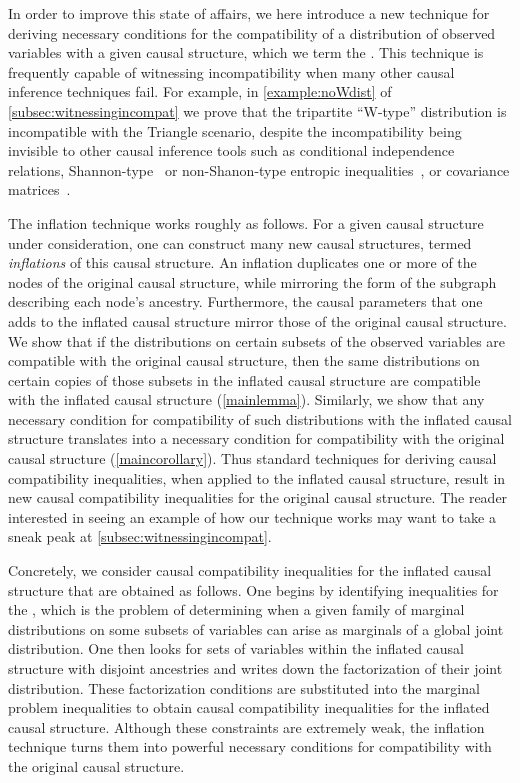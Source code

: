 \documentclass[aps,english,10pt,superscriptaddress,onecolumn,twoside,longbibliography,pra,floatfix,fleqn,nofootinbib]{revtex4-1}
\newcommand*{\tblue}[1]{{\color{medblue}{\textbf{#1}}}}
\theoremstyle{definition}
\newcounter{example}[section]
\begin{document}
In order to improve this state of affairs, we here introduce a new technique for deriving necessary conditions for the compatibility of a distribution of observed variables with a given causal structure, which we term the {\em\tblue{inflation technique}}. This technique is frequently capable of witnessing incompatibility when many other causal inference techniques fail. For example, in \cref{example:noWdist} of \cref{subsec:witnessingincompat} we prove that the tripartite ``W-type'' distribution is incompatible with the Triangle scenario, despite the incompatibility being invisible to other causal inference tools such as conditional independence relations, Shannon-type~\cite{fritz2013marginal,chaves2014novel,chaves2014informationinference} or non-Shanon-type entropic inequalities~\cite{weilenmann2016entropic}, or covariance matrices~\cite{kela2016covariance}.

The inflation technique works roughly as follows. For a given causal structure under consideration, one can construct many new causal structures, termed {\em inflations} of this causal structure. An inflation duplicates one or more of the nodes of the original causal structure, while mirroring the form of the subgraph describing each node's ancestry. Furthermore, the causal parameters that one adds to the inflated causal structure mirror those of the original causal structure.  We show that if the distributions on certain subsets of the observed variables are compatible with the original causal structure, then the same distributions on certain copies of those subsets in the inflated causal structure are compatible with the inflated causal structure (\cref{mainlemma}).  Similarly, we show that any necessary condition for compatibility of such distributions with the inflated causal structure translates into a necessary condition for compatibility with the original causal structure (\cref{maincorollary}).  Thus standard techniques for deriving causal compatibility inequalities, when applied to the inflated causal structure, result in new causal compatibility inequalities for the original causal structure. The reader interested in seeing an example of how our technique works may want to take a sneak peak at \cref{subsec:witnessingincompat}.

Concretely, we consider causal compatibility inequalities for the inflated causal structure that are obtained as follows.  One begins by identifying inequalities for the \tblue{marginal problem}, which is the problem of determining when a given family of marginal distributions on some subsets of variables can arise as marginals of a global joint distribution. One then looks for sets of variables within the inflated causal structure with disjoint ancestries and writes down the factorization of their joint distribution.  These factorization conditions are substituted into the marginal problem inequalities to obtain causal compatibility inequalities for the inflated causal structure. Although these constraints are extremely weak, the inflation technique turns them into powerful necessary conditions for compatibility with the original causal structure.
\end{document}

